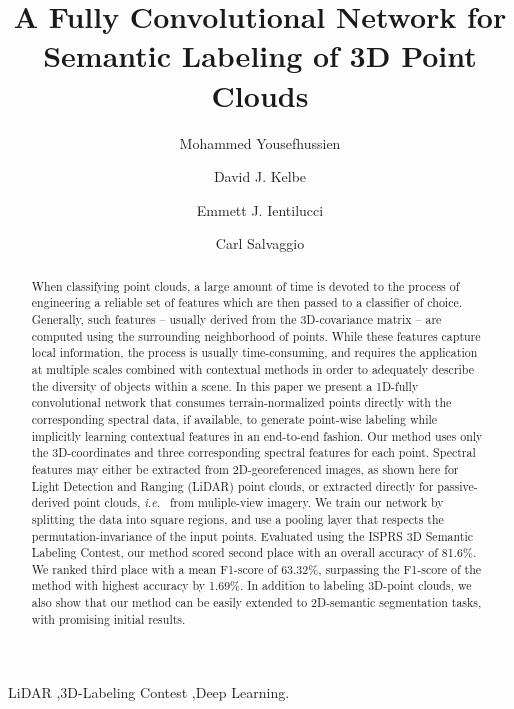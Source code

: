 \documentclass[final,3p,times,twocolumn,authoryear]{elsarticle}
\newcommand{\ie}{\textit{i}.\textit{e}.}
\begin{document}
\begin{frontmatter}



\title{A Fully Convolutional Network for Semantic Labeling of 3D Point Clouds}


\author[add1]{Mohammed Yousefhussien}
\author[add2]{David J. Kelbe}
\author[add1]{Emmett J. Ientilucci}
\author[add1]{Carl Salvaggio}
\address[add1]{Rochester Institute of Technology, Chester F. Carlson Center for Imaging Science, Rochester, NY, USA}
\address[add2]{Oak Ridge National Laboratory, Geographic Information Science and Technology Group, Oak Ridge, TN, USA}

\begin{abstract}
When classifying point clouds, a large amount of time is devoted  to the process of engineering a reliable set of features which are then passed to a classifier of choice. Generally, such features -- usually derived from the 3D-covariance matrix -- are computed using the surrounding neighborhood of points. 
While these features capture local information, the process is usually time-consuming, and requires the application at multiple scales combined with contextual methods in order to adequately describe the diversity of objects within a scene. 
In this paper we present a 1D-fully convolutional network that consumes terrain-normalized points directly with the corresponding spectral data, if available, to generate point-wise labeling while implicitly learning contextual features in an end-to-end fashion.
Our method uses only the 3D-coordinates and three corresponding spectral features for each point. 
Spectral features may either be extracted from 2D-georeferenced images, as shown here for Light Detection and Ranging (LiDAR) point clouds, or extracted directly for passive-derived point clouds, \ie~ from muliple-view imagery. 
We train our network by splitting the data into square regions, and use a pooling layer that respects the permutation-invariance of the input points.
Evaluated using the ISPRS 3D Semantic Labeling Contest, our method scored second place with an overall accuracy of 81.6\%. 
We ranked third place with a mean F1-score of 63.32\%, surpassing the F1-score of the method with highest accuracy by 1.69\%. 
In addition to labeling 3D-point clouds, we also show that our method can be easily extended to 2D-semantic segmentation tasks, with promising initial results.

\end{abstract}

\begin{keyword}
LiDAR \sep 3D-Labeling Contest \sep Deep Learning.


\end{keyword}

\end{frontmatter}
\end{document}
